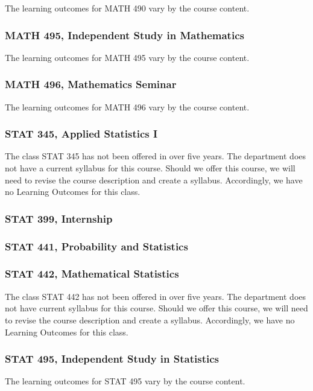 \documentclass[11pt]{article}
\begin{document}
The learning outcomes for MATH 490 vary by the course content.

\subsubsection*{MATH 495, Independent Study in Mathematics}


The learning outcomes for MATH 495 vary by the course content.

\subsubsection*{MATH 496, Mathematics Seminar}

The learning outcomes for MATH 496 vary by the course content.


\subsubsection*{STAT 345, Applied Statistics I}

The class STAT 345 has not been offered in over five years.  The
department does not have a current syllabus for this course. Should we offer this course,  we will need to revise
the course description and create a syllabus. Accordingly, we have no Learning Outcomes for this class.


\subsubsection*{STAT 399, Internship}

\subsubsection*{STAT 441, Probability and Statistics}


\subsubsection*{STAT 442, Mathematical Statistics}

The class STAT 442 has not been offered in over five years. The
department does not have current syllabus for this course. Should we offer this course,  we will need to revise
the course description and create a syllabus. Accordingly, we have no Learning Outcomes for this class.

\subsubsection*{STAT 495, Independent Study in Statistics}

The learning outcomes for STAT 495 vary by the course content.

\end{document}
